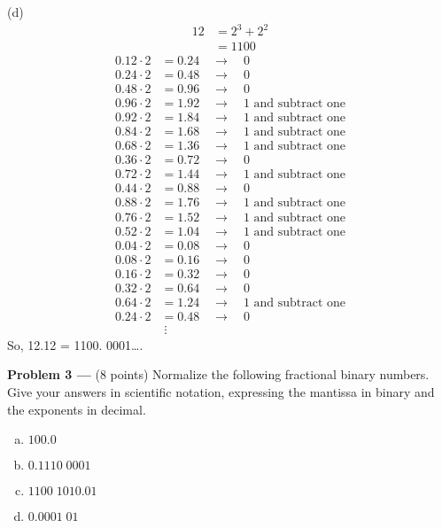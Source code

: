 \documentclass[11pt]{article}
\newcommand{\problem}[1]{\textbf{Problem #1 ---} }
\begin{document}
(d)
\begin{align*}
    12 &= 2^3+2^2\\
       &= 1100
\end{align*}
\begin{align*}
    0.12 \cdot 2 &= 0.24 \quad\rightarrow\quad 0\\
    0.24 \cdot 2 &= 0.48 \quad\rightarrow\quad 0\\
	0.48 \cdot 2 &= 0.96 \quad\rightarrow\quad 0\\
	0.96 \cdot 2 &= 1.92 \quad\rightarrow\quad 1 \text{ and subtract one}\\
	0.92 \cdot 2 &= 1.84 \quad\rightarrow\quad 1 \text{ and subtract one}\\
	0.84 \cdot 2 &= 1.68 \quad\rightarrow\quad 1 \text{ and subtract one}\\
	0.68 \cdot 2 &= 1.36 \quad\rightarrow\quad 1 \text{ and subtract one}\\
	0.36 \cdot 2 &= 0.72 \quad\rightarrow\quad 0\\
	0.72 \cdot 2 &= 1.44 \quad\rightarrow\quad 1 \text{ and subtract one}\\
	0.44 \cdot 2 &= 0.88 \quad\rightarrow\quad 0\\
	0.88 \cdot 2 &= 1.76 \quad\rightarrow\quad 1 \text{ and subtract one}\\
	0.76 \cdot 2 &= 1.52 \quad\rightarrow\quad 1 \text{ and subtract one}\\
	0.52 \cdot 2 &= 1.04 \quad\rightarrow\quad 1 \text{ and subtract one}\\
	0.04 \cdot 2 &= 0.08 \quad\rightarrow\quad 0\\
	0.08 \cdot 2 &= 0.16 \quad\rightarrow\quad 0\\
	0.16 \cdot 2 &= 0.32 \quad\rightarrow\quad 0\\
	0.32 \cdot 2 &= 0.64 \quad\rightarrow\quad 0\\
	0.64 \cdot 2 &= 1.24 \quad\rightarrow\quad 1 \text{ and subtract one}\\
	0.24 \cdot 2 &= 0.48 \quad\rightarrow\quad 0\\
    &\;\vdots
\end{align*}
So, 12.12 = 1100. 0001\ldots.

\problem{3}(8 points) Normalize the following fractional binary numbers.  Give your answers in scientific notation, expressing the mantissa in binary and the exponents in decimal.
\begin{enumerate}[(a)]
    \item $100.0$
    \item $0.1110\;0001$
    \item $1100\;1010.01$
    \item $0.0001\;01$
\end{enumerate}
\end{document}
